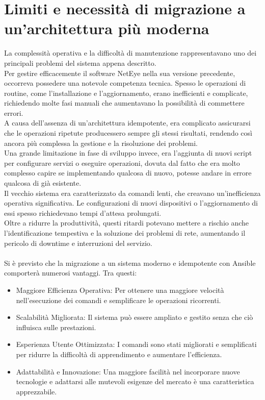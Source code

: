 \section{Limiti e necessità di migrazione a un'architettura più moderna}
\label{sec:necessita_di_migrazione} La complessità operativa e la difficoltà di manutenzione
rappresentavano uno dei principali problemi del sistema appena descritto.\\ Per gestire
efficacemente il software NetEye nella sua versione precedente, occorreva
possedere una notevole competenza tecnica. Spesso le operazioni di routine, come
l'installazione e l'aggiornamento, erano inefficienti e complicate, richiedendo
molte fasi manuali che aumentavano la possibilità di commettere errori.\\ A
causa dell'assenza di un'architettura idempotente, era complicato assicurarsi che
le operazioni ripetute producessero sempre gli stessi risultati, rendendo così
ancora più complessa la gestione e la risoluzione dei problemi.\\ Una grande
limitazione in fase di sviluppo invece, era l'aggiunta di nuovi script per configurare
servizi o eseguire operazioni, dovuta dal fatto che era molto complesso capire
se implementando qualcosa di nuovo, potesse andare in errore qualcosa di già esistente.\\
Il vecchio sistema era caratterizzato da comandi lenti, che creavano un'inefficienza
operativa significativa. Le configurazioni di nuovi dispositivi o l'aggiornamento
di essi spesso richiedevano tempi d'attesa prolungati.\\ Oltre a ridurre la produttività,
questi ritardi potevano mettere a rischio anche l'identificazione tempestiva e
la soluzione dei problemi di rete, aumentando il pericolo di downtime e interruzioni
del servizio.\\ \\ Si è previsto che la migrazione a un sistema moderno e idempotente
con Ansible comporterà numerosi vantaggi. Tra questi:
\begin{itemize}
  \item Maggiore Efficienza Operativa: Per ottenere una maggiore velocità nell'esecuzione
    dei comandi e semplificare le operazioni ricorrenti.

  \item Scalabilità Migliorata: Il sistema può essere ampliato e gestito senza
    che ciò influisca sulle prestazioni.

  \item Esperienza Utente Ottimizzata: I comandi sono stati migliorati e
    semplificati per ridurre la difficoltà di apprendimento e aumentare l'efficienza.

  \item Adattabilità e Innovazione: Una maggiore facilità nel incorporare nuove
    tecnologie e adattarsi alle mutevoli esigenze del mercato è una
    caratteristica apprezzabile.
\end{itemize}
